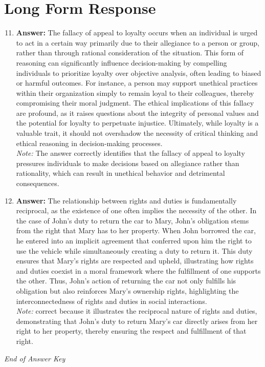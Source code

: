 \documentclass[12pt]{article}
\begin{document}
\section*{Long Form Response}
\begin{enumerate}[label=\arabic*.]
\setcounter{enumi}{10}
\item \textbf{Answer:} The fallacy of appeal to loyalty occurs when an individual is urged to act in a certain way primarily due to their allegiance to a person or group, rather than through rational consideration of the situation. This form of reasoning can significantly influence decision-making by compelling individuals to prioritize loyalty over objective analysis, often leading to biased or harmful outcomes. For instance, a person may support unethical practices within their organization simply to remain loyal to their colleagues, thereby compromising their moral judgment. The ethical implications of this fallacy are profound, as it raises questions about the integrity of personal values and the potential for loyalty to perpetuate injustice. Ultimately, while loyalty is a valuable trait, it should not overshadow the necessity of critical thinking and ethical reasoning in decision-making processes.
\\ \textit{Note:} The answer correctly identifies that the fallacy of appeal to loyalty pressures individuals to make decisions based on allegiance rather than rationality, which can result in unethical behavior and detrimental consequences.
\item \textbf{Answer:} The relationship between rights and duties is fundamentally reciprocal, as the existence of one often implies the necessity of the other. In the case of John's duty to return the car to Mary, John's obligation stems from the right that Mary has to her property. When John borrowed the car, he entered into an implicit agreement that conferred upon him the right to use the vehicle while simultaneously creating a duty to return it. This duty ensures that Mary's rights are respected and upheld, illustrating how rights and duties coexist in a moral framework where the fulfillment of one supports the other. Thus, John's action of returning the car not only fulfills his obligation but also reinforces Mary's ownership rights, highlighting the interconnectedness of rights and duties in social interactions.
\\ \textit{Note:} correct because it illustrates the reciprocal nature of rights and duties, demonstrating that John's duty to return Mary's car directly arises from her right to her property, thereby ensuring the respect and fulfillment of that right.
\end{enumerate}

\vfill
\noindent\textit{End of Answer Key}
\end{document}

